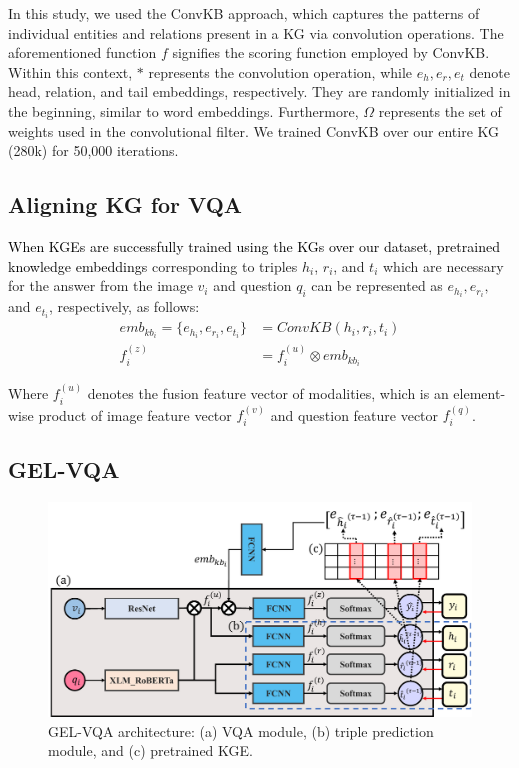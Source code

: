 \documentclass[letterpaper]{article} %
\newcommand{\kt}[1]{\textcolor{black}{#1}}
\begin{document}
In this study, we used the ConvKB approach, which captures the patterns of individual entities and relations present in a KG via convolution operations. The aforementioned function $f$ signifies the scoring function employed by ConvKB. Within this context, $*$ represents the convolution operation, while $e_h, e_r, e_t$ denote head, relation, and tail embeddings, respectively. They are randomly initialized in the beginning, similar to word embeddings. Furthermore, $\Omega$ represents the set of weights used in the convolutional filter. We trained ConvKB over our entire KG (280k) for 50,000 iterations.

\subsection{Aligning KG for VQA}\label{subsec:AlingnKG}
\kt{When KGEs are successfully trained using the KGs over our dataset, pretrained knowledge embeddings} corresponding to triples $h_i$, $r_i$, and $t_i$ which are necessary for the answer from the image $v_i$ and question $q_i$ can be represented as $e_{h_i}, e_{r_i},$ and $e_{t_i}$, respectively, as follows:
\begin{align}
emb_{kb_i} = \{e_{h_i}, e_{r_i}, e_{t_i}\} &= ConvKB(h_i, r_i, t_i)\\
f^{(z)}_i &= f^{(u)}_i\otimes emb_{kb_i}
\end{align}

Where $f^{(u)}_i$ denotes the fusion feature vector of modalities, which is an element-wise product of image feature vector $f^{(v)}_i$ and question feature vector $f^{(q)}_i$.

\subsection{GEL-VQA}\label{subsec:GEL-VQA}

\begin{figure}[H]
\centering
\includegraphics[width=\linewidth]{model_images/GEL_VQA.pdf}
\caption{GEL-VQA architecture: (a) VQA module, (b) triple prediction module, and (c) pretrained KGE.}
\label{fig:GEL-VQA}
\end{figure}
\end{document}
